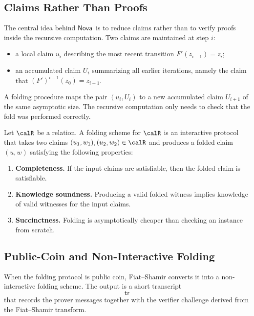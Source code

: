 \documentclass[11pt]{article}
\newcommand{\Nova}{\ensuremath{\mathsf{Nova}}}
\begin{document}
\subsection{Claims Rather Than Proofs}

The central idea behind \Nova\ is to reduce claims rather than to verify proofs
inside the recursive computation.  Two claims are maintained at step $i$:
\begin{itemize}
  \item a local claim $u_i$ describing the most recent transition
        $F'(z_{i-1}) = z_i$;
  \item an accumulated claim $U_i$ summarizing all earlier iterations,
        namely the claim that $(F')^{i-1}(z_0)=z_{i-1}$.
\end{itemize}

A folding procedure maps the pair $(u_i, U_i)$ to a new accumulated claim
$U_{i+1}$ of the same asymptotic size.  The recursive computation only needs to
check that the fold was performed correctly.

\begin{definition}
Let $\calR$ be a relation.  A folding scheme for $\calR$ is an interactive
protocol that takes two claims $(u_1,w_1),(u_2,w_2) \in \calR$ and produces a
folded claim $(u,w)$ satisfying the following properties:
\begin{enumerate}
  \item \textbf{Completeness.} If the input claims are satisfiable, then the
        folded claim is satisfiable.
  \item \textbf{Knowledge soundness.} Producing a valid folded witness implies
        knowledge of valid witnesses for the input claims.
  \item \textbf{Succinctness.} Folding is asymptotically cheaper than checking
        an instance from scratch.
\end{enumerate}
\end{definition}

\subsection{Public-Coin and Non-Interactive Folding}

When the folding protocol is public coin, Fiat--Shamir converts it into a
non-interactive folding scheme.  The output is a short transcript
\[
  \mathsf{tr}
\]
that records the prover messages together with the verifier challenge derived
from the Fiat--Shamir transform.
\end{document}
